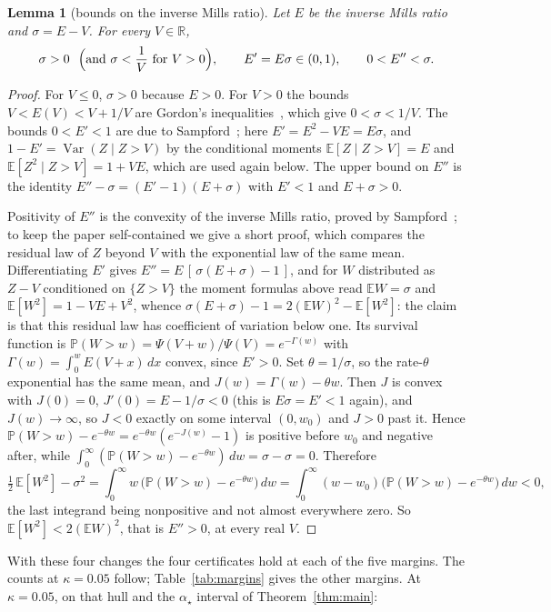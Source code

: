\documentclass[11pt]{article}
\newtheorem{lemma}[theorem]{Lemma}
\theoremstyle{remark}
\newcommand{\E}{\mathbb{E}}
\newcommand{\Prob}{\mathbb{P}}
\newcommand{\R}{\mathbb{R}}
\begin{document}
\begin{lemma}[bounds on the inverse Mills ratio]\label{lem:mills}
Let $E$ be the inverse Mills ratio and $\sigma=E-V$.  For every
$V\in\R$,
\[
\sigma>0\ \ \Bigl(\text{and } \sigma<\frac1V \text{ for } V>0\Bigr),\qquad
E'=E\sigma\in(0,1),\qquad
0<E''<\sigma .
\]
\end{lemma}

\begin{proof}
For $V\le0$, $\sigma>0$ because $E>0$.  For $V>0$ the bounds
$V<E(V)<V+1/V$ are Gordon's inequalities~\cite{gordon1941}, which give
$0<\sigma<1/V$.  The bounds $0<E'<1$ are due to
Sampford~\cite{sampford1953}; here $E'=E^2-VE=E\sigma$,
and $1-E'=\operatorname{Var}(Z\mid Z>V)$ by the conditional moments
$\E[Z\mid Z>V]=E$ and $\E[Z^2\mid Z>V]=1+VE$, which are used again
below.  The upper bound on $E''$ is
the identity $E''-\sigma=(E'-1)(E+\sigma)$ with $E'<1$ and $E+\sigma>0$.

Positivity of $E''$ is the convexity of the inverse Mills ratio, proved
by Sampford~\cite{sampford1953}; to keep the paper self-contained we give a
short proof, which compares the
residual law of $Z$ beyond $V$ with the exponential law of the same mean.
Differentiating $E'$ gives
$E''=E\,[\,\sigma(E+\sigma)-1\,]$, and for $W$ distributed as $Z-V$ conditioned
on $\{Z>V\}$ the moment formulas above read $\E W=\sigma$ and
$\E[W^2]=1-VE+V^2$, whence $\sigma(E+\sigma)-1=2(\E W)^2-\E[W^2]$: the claim is
that this residual law has coefficient of variation below one.  Its
survival function is
$\Prob(W>w)=\Psi(V+w)/\Psi(V)=e^{-\Gamma(w)}$ with
$\Gamma(w)=\int_0^w E(V+x)\,dx$ convex, since $E'>0$.  Set $\theta=1/\sigma$,
so the rate-$\theta$ exponential has the same mean, and
$J(w)=\Gamma(w)-\theta w$.  Then $J$ is convex with $J(0)=0$,
$J'(0)=E-1/\sigma<0$ (this is $E\sigma=E'<1$ again), and $J(w)\to\infty$, so
$J<0$ exactly on some interval $(0,w_0)$ and $J>0$ past it.  Hence
$\Prob(W>w)-e^{-\theta w}=e^{-\theta w}(e^{-J(w)}-1)$ is positive
before $w_0$ and negative after, while
$\int_0^\infty(\Prob(W>w)-e^{-\theta w})\,dw=\sigma-\sigma=0$.  Therefore
\[
\tfrac12\,\E[W^2]-\sigma^2
=\int_0^\infty w\,\bigl(\Prob(W>w)-e^{-\theta w}\bigr)\,dw
=\int_0^\infty (w-w_0)\bigl(\Prob(W>w)-e^{-\theta w}\bigr)\,dw<0,
\]
the last integrand being nonpositive and not almost everywhere zero.
So $\E[W^2]<2(\E W)^2$, that is $E''>0$, at every real $V$.
\end{proof}

With these four changes
the four certificates hold at each of the five
margins.  The counts at $\kappa=0.05$ follow; Table~\ref{tab:margins} gives the
other margins.  At $\kappa=0.05$, on
that hull and the $\alpha_\star$ interval of
Theorem~\ref{thm:main}:
\end{document}
